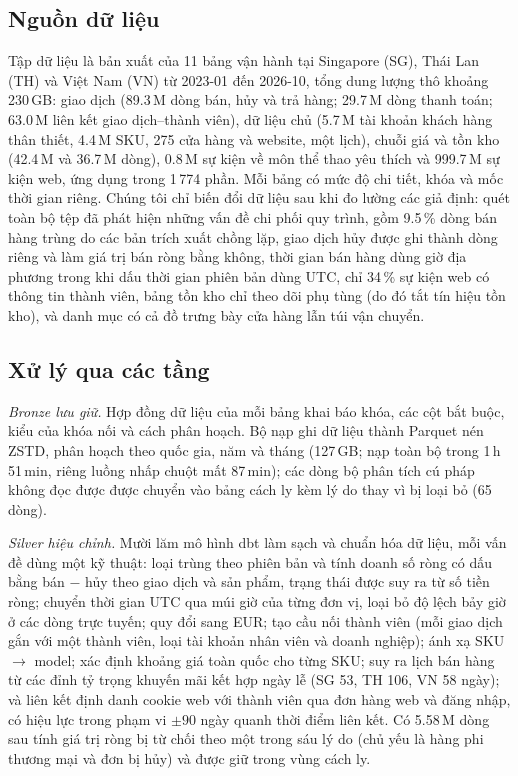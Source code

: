\documentclass[jtehm]{ieeeaccess}
\begin{document}
\subsection{Nguồn dữ liệu}
Tập dữ liệu là bản xuất của 11 bảng vận hành tại Singapore (SG), Thái Lan (TH) và Việt Nam (VN) từ 2023-01 đến 2026-10, tổng dung lượng thô khoảng 230\,GB: giao dịch (89.3\,M dòng bán, hủy và trả hàng; 29.7\,M dòng thanh toán; 63.0\,M liên kết giao dịch--thành viên), dữ liệu chủ (5.7\,M tài khoản khách hàng thân thiết, 4.4\,M SKU, 275 cửa hàng và website, một lịch), chuỗi giá và tồn kho (42.4\,M và 36.7\,M dòng), 0.8\,M sự kiện về môn thể thao yêu thích và 999.7\,M sự kiện web, ứng dụng trong 1\,774 phần. Mỗi bảng có mức độ chi tiết, khóa và mốc thời gian riêng. Chúng tôi chỉ biến đổi dữ liệu sau khi đo lường các giả định: quét toàn bộ tệp đã phát hiện những vấn đề chi phối quy trình, gồm 9.5\,\% dòng bán hàng trùng do các bản trích xuất chồng lặp, giao dịch hủy được ghi thành dòng riêng và làm giá trị bán ròng bằng không, thời gian bán hàng dùng giờ địa phương trong khi dấu thời gian phiên bản dùng UTC, chỉ 34\,\% sự kiện web có thông tin thành viên, bảng tồn kho chỉ theo dõi phụ tùng (do đó tắt tín hiệu tồn kho), và danh mục có cả đồ trưng bày cửa hàng lẫn túi vận chuyển.

\subsection{Xử lý qua các tầng}
\textit{Bronze lưu giữ.} Hợp đồng dữ liệu của mỗi bảng khai báo khóa, các cột bắt buộc, kiểu của khóa nối và cách phân hoạch. Bộ nạp ghi dữ liệu thành Parquet nén ZSTD, phân hoạch theo quốc gia, năm và tháng (127\,GB; nạp toàn bộ trong 1\,h\,51\,min, riêng luồng nhấp chuột mất 87\,min); các dòng bộ phân tích cú pháp không đọc được được chuyển vào bảng cách ly kèm lý do thay vì bị loại bỏ (65 dòng).

\textit{Silver hiệu chỉnh.} Mười lăm mô hình dbt làm sạch và chuẩn hóa dữ liệu, mỗi vấn đề dùng một kỹ thuật: loại trùng theo phiên bản và tính doanh số ròng có dấu bằng bán $-$ hủy theo giao dịch và sản phẩm, trạng thái được suy ra từ số tiền ròng; chuyển thời gian UTC qua múi giờ của từng đơn vị, loại bỏ độ lệch bảy giờ ở các dòng trực tuyến; quy đổi sang EUR; tạo cầu nối thành viên (mỗi giao dịch gắn với một thành viên, loại tài khoản nhân viên và doanh nghiệp); ánh xạ SKU $\to$ model; xác định khoảng giá toàn quốc cho từng SKU; suy ra lịch bán hàng từ các đỉnh tỷ trọng khuyến mãi kết hợp ngày lễ (SG 53, TH 106, VN 58 ngày); và liên kết định danh cookie web với thành viên qua đơn hàng web và đăng nhập, có hiệu lực trong phạm vi $\pm 90$ ngày quanh thời điểm liên kết. Có 5.58\,M dòng sau tính giá trị ròng bị từ chối theo một trong sáu lý do (chủ yếu là hàng phi thương mại và đơn bị hủy) và được giữ trong vùng cách ly.
\end{document}
